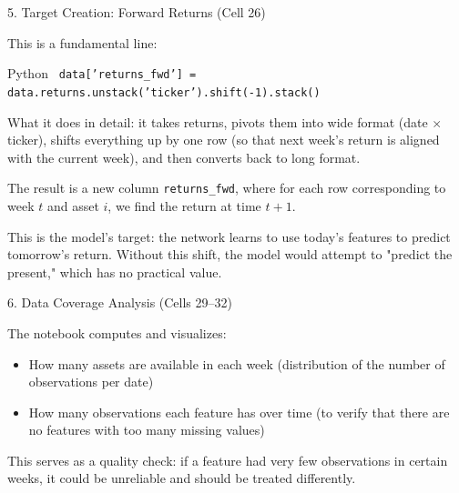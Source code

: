 \documentclass[aspectratio=169, 11pt]{beamer}
\begin{document}
\begin{frame}{5. Target Creation: Forward Returns (Cell 26)}

This is a fundamental line:

\vspace{0.3cm}

\begin{block}{Python}
\small
\texttt{
data['returns\_fwd'] = data.returns.unstack('ticker').shift(-1).stack()
}
\end{block}

\vspace{0.3cm}

What it does in detail: it takes returns, pivots them into wide format (date $\times$ ticker), shifts everything up by one row (so that next week's return is aligned with the current week), and then converts back to long format.

\vspace{0.3cm}

The result is a new column \texttt{returns\_fwd}, where for each row corresponding to week $t$ and asset $i$, we find the return at time $t+1$.

\vspace{0.3cm}

This is the model's target: the network learns to use today's features to predict tomorrow's return. Without this shift, the model would attempt to "predict the present," which has no practical value.

\end{frame}
%
%
\begin{frame}{6. Data Coverage Analysis (Cells 29--32)}

The notebook computes and visualizes:

\vspace{0.3cm}

\begin{itemize}
    \item How many assets are available in each week (distribution of the number of observations per date)
    \item How many observations each feature has over time (to verify that there are no features with too many missing values)
\end{itemize}

\vspace{0.3cm}

This serves as a quality check: if a feature had very few observations in certain weeks, it could be unreliable and should be treated differently.

\end{frame}
\end{document}

